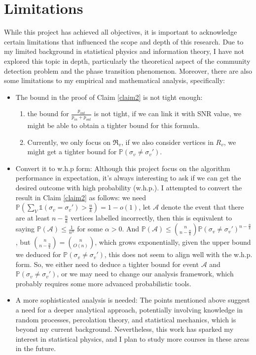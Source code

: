 \section{Limitations}
While this project has achieved all objectives, it is important to acknowledge certain limitations that influenced the scope and depth of this research. Due to my limited background in statistical physics and information theory, I have not explored this topic in depth, particularly the theoretical aspect of the community detection problem and the phase transition phenomenon. Moreover, there are also some limitations to my empirical and mathematical analysis, specifically:
\begin{itemize}
    \item The bound in the proof of Claim \ref{claim2} is not tight enough: \begin{enumerate}
        \item the bound for $\frac{p_{out}}{p_{in}+p_{out}}$ is not tight, if we can link it with SNR value, we might be able to obtain a tighter bound for this formula.
        \item Currently, we only focus on $\Re_v$, if we also consider vertices in $R_v$, we might get a tighter bound for $\mathbb{P}(\sigma_v\neq\sigma_{v}')$.
    \end{enumerate}
    \item Convert it to w.h.p form: Although this project focus on the algorithm performance in expectation, it's always interesting to ask if we can get the desired outcome with high probability (w.h.p.). I attempted to convert the result in Claim \ref{claim2} as follows: we need $\mathbb{P}(\sum_V\mathbb{1}(\sigma_v=\sigma_{v}')>\frac{n}{k})=1-o(1)$, let $\mathcal{A}$ denote the event that there are at least $n-\frac{n}{k}$ vertices labelled incorrectly, then this is equivalent to saying $\mathbb{P}(\mathcal{A})\leq \frac{1}{n^{\alpha}}$ for some $\alpha>0.$ And $\mathbb{P}(\mathcal{A})\leq\binom{n}{n-\frac{n}{k}}\mathbb{P}(\sigma_v\neq\sigma_{v}')^{n-\frac{n}{k}}$, but $\binom{n}{n-\frac{n}{k}}=\binom{n}{O(n)}$, which grows exponentially, given the upper bound we deduced for $\mathbb{P}(\sigma_v\neq\sigma_{v}')$,  this does not seem to align well with the w.h.p. form. So, we either need to deduce a tighter bound for event $\mathcal{A}$ and $\mathbb{P}(\sigma_v \neq \sigma_{v}')$, or we may need to change our analysis framework, which probably requires some more advanced probabilistic tools.
    \item A more sophisticated analysis is needed: The points mentioned above suggest a need for a deeper analytical approach, potentially involving knowledge in random processes, percolation theory, and statistical mechanics, which is beyond my current background. Nevertheless, this work has sparked my interest in statistical physics, and I plan to study more courses in these areas in the future.

\end{itemize}
